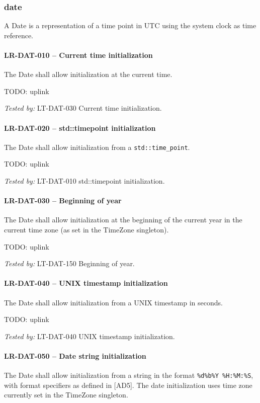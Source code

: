 \subsubsection{date}
A Date is a representation of a time point in UTC using the system clock
as time reference.

\paragraph{LR-DAT-010 -- Current time initialization}
The Date shall allow initialization at the current time.

TODO: uplink

\textit{Tested by: } LT-DAT-030 Current time initialization.

\paragraph{LR-DAT-020 -- std::time\textunderscore point initialization}
The Date shall allow initialization from a \lstinline{std::time_point}.

TODO: uplink

\textit{Tested by: } LT-DAT-010 std::time\textunderscore point initialization.

\paragraph{LR-DAT-030 -- Beginning of year}
The Date shall allow initialization at the beginning of the current year
in the current time zone (as set in the TimeZone singleton).

TODO: uplink

\textit{Tested by: } LT-DAT-150 Beginning of year.

\paragraph{LR-DAT-040 -- UNIX timestamp initialization}
The Date shall allow initialization from a UNIX timestamp in seconds.

TODO: uplink

\textit{Tested by: } LT-DAT-040 UNIX timestamp initialization.

\paragraph{LR-DAT-050 -- Date string initialization}
The Date shall allow initialization from a string in the format
\lstinline{%d%b%Y %H:%M:%S}, with format specifiers as defined in [AD5].
The date initialization uses time zone currently set
in the TimeZone singleton.

